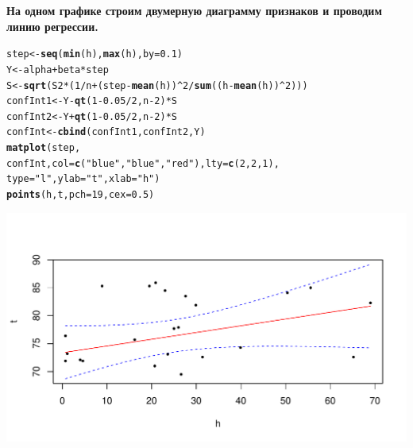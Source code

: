 \documentclass{article}\usepackage[]{graphicx}\usepackage[]{color}
\makeatletter
\def\maxwidth{ %
  \ifdim\Gin@nat@width>\linewidth
    \linewidth
  \else
    \Gin@nat@width
  \fi
}
\newcommand{\hlnum}[1]{\textcolor[rgb]{0.686,0.059,0.569}{#1}}%
\newcommand{\hlstr}[1]{\textcolor[rgb]{0.192,0.494,0.8}{#1}}%
\newcommand{\hlopt}[1]{\textcolor[rgb]{0,0,0}{#1}}%
\newcommand{\hlstd}[1]{\textcolor[rgb]{0.345,0.345,0.345}{#1}}%
\newcommand{\hlkwb}[1]{\textcolor[rgb]{0.69,0.353,0.396}{#1}}%
\newcommand{\hlkwc}[1]{\textcolor[rgb]{0.333,0.667,0.333}{#1}}%
\newcommand{\hlkwd}[1]{\textcolor[rgb]{0.737,0.353,0.396}{\textbf{#1}}}%
\newenvironment{kframe}{%
 \def\at@end@of@kframe{}%
 \ifinner\ifhmode%
  \def\at@end@of@kframe{\end{minipage}}%
  \begin{minipage}{\columnwidth}%
 \fi\fi%
 \def\FrameCommand##1{\hskip\@totalleftmargin \hskip-\fboxsep
 \colorbox{shadecolor}{##1}\hskip-\fboxsep
     \hskip-\linewidth \hskip-\@totalleftmargin \hskip\columnwidth}%
 \MakeFramed {\advance\hsize-\width
   \@totalleftmargin\z@ \linewidth\hsize
   \@setminipage}}%
 {\par\unskip\endMakeFramed%
 \at@end@of@kframe}
\newenvironment{knitrout}{}{} %
\makeatother
\begin{document}
\textbf{На одном графике строим двумерную диаграмму признаков и проводим линию регрессии.}
\begin{knitrout}
\color{fgcolor}\begin{kframe}
\begin{alltt}
\hlstd{step} \hlkwb{<-} \hlkwd{seq}\hlstd{(}\hlkwd{min}\hlstd{(h),} \hlkwd{max}\hlstd{(h),} \hlkwc{by} \hlstd{=} \hlnum{0.1}\hlstd{)}
\hlstd{Y} \hlkwb{<-} \hlstd{alpha} \hlopt{+} \hlstd{beta}\hlopt{*}\hlstd{step}
\hlstd{S} \hlkwb{<-} \hlkwd{sqrt}\hlstd{(S2}\hlopt{*}\hlstd{(} \hlnum{1}\hlopt{/}\hlstd{n} \hlopt{+} \hlstd{(step} \hlopt{-} \hlkwd{mean}\hlstd{(h))}\hlopt{^}\hlnum{2}\hlopt{/}\hlkwd{sum}\hlstd{((h} \hlopt{-} \hlkwd{mean}\hlstd{(h))}\hlopt{^}\hlnum{2}\hlstd{)))}
\hlstd{confInt1} \hlkwb{<-} \hlstd{Y} \hlopt{-} \hlkwd{qt}\hlstd{(}\hlnum{1}\hlopt{-}\hlnum{0.05}\hlopt{/}\hlnum{2}\hlstd{, n} \hlopt{-} \hlnum{2}\hlstd{)} \hlopt{*} \hlstd{S}
\hlstd{confInt2} \hlkwb{<-} \hlstd{Y} \hlopt{+} \hlkwd{qt}\hlstd{(}\hlnum{1}\hlopt{-}\hlnum{0.05}\hlopt{/}\hlnum{2}\hlstd{, n} \hlopt{-} \hlnum{2}\hlstd{)} \hlopt{*} \hlstd{S}
\hlstd{confInt} \hlkwb{<-} \hlkwd{cbind}\hlstd{(confInt1, confInt2, Y)}
\hlkwd{matplot}\hlstd{(step,}
\hlstd{confInt,} \hlkwc{col}\hlstd{=}\hlkwd{c}\hlstd{(}\hlstr{"blue"}\hlstd{,}\hlstr{"blue"}\hlstd{,}\hlstr{"red"}\hlstd{),}\hlkwc{lty}\hlstd{=}\hlkwd{c}\hlstd{(}\hlnum{2}\hlstd{,}\hlnum{2}\hlstd{,}\hlnum{1}\hlstd{),}
\hlkwc{type}\hlstd{=} \hlstr{"l"}\hlstd{,} \hlkwc{ylab} \hlstd{=} \hlstr{"t"}\hlstd{,} \hlkwc{xlab} \hlstd{=} \hlstr{"h"}\hlstd{)}
\hlkwd{points}\hlstd{(h, t,} \hlkwc{pch} \hlstd{=} \hlnum{19}\hlstd{,} \hlkwc{cex} \hlstd{=} \hlnum{0.5}\hlstd{)}
\end{alltt}
\end{kframe}
\includegraphics[width=\maxwidth]{figure/unnamed-chunk-7-1} 

\end{knitrout}
\end{document}
